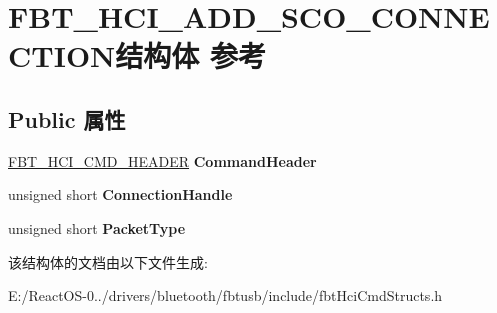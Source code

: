 \hypertarget{struct_f_b_t___h_c_i___a_d_d___s_c_o___c_o_n_n_e_c_t_i_o_n}{}\section{F\+B\+T\+\_\+\+H\+C\+I\+\_\+\+A\+D\+D\+\_\+\+S\+C\+O\+\_\+\+C\+O\+N\+N\+E\+C\+T\+I\+O\+N结构体 参考}
\label{struct_f_b_t___h_c_i___a_d_d___s_c_o___c_o_n_n_e_c_t_i_o_n}
\subsection*{Public 属性}
\begin{DoxyCompactItemize}
\item 
\mbox{\label{struct_f_b_t___h_c_i___a_d_d___s_c_o___c_o_n_n_e_c_t_i_o_n_aade748398d100f4e08ebb79ea00594a3}} 
\hyperlink{struct_f_b_t___h_c_i___c_m_d___h_e_a_d_e_r}{F\+B\+T\+\_\+\+H\+C\+I\+\_\+\+C\+M\+D\+\_\+\+H\+E\+A\+D\+ER} {\bfseries Command\+Header}
\item 
\mbox{\label{struct_f_b_t___h_c_i___a_d_d___s_c_o___c_o_n_n_e_c_t_i_o_n_a55aa0f88e6ad8febd3fbb809c91c3a35}} 
unsigned short {\bfseries Connection\+Handle}
\item 
\mbox{\label{struct_f_b_t___h_c_i___a_d_d___s_c_o___c_o_n_n_e_c_t_i_o_n_ad36fbf5f31c04e8578fdd2e673536c8f}} 
unsigned short {\bfseries Packet\+Type}
\end{DoxyCompactItemize}


该结构体的文档由以下文件生成\+:\begin{DoxyCompactItemize}
\item 
E\+:/\+React\+O\+S-\/0../drivers/bluetooth/fbtusb/include/fbt\+Hci\+Cmd\+Structs.\+h\end{DoxyCompactItemize}
